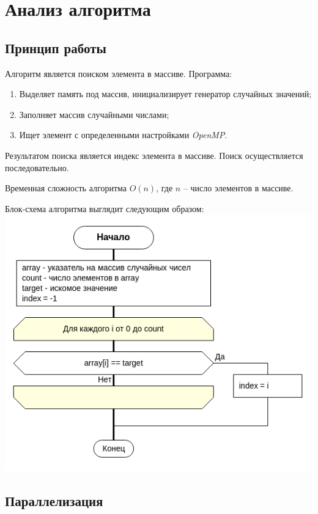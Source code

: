 \section{Анализ алгоритма}

\subsection{Принцип работы}

Алгоритм является поиском элемента в массиве.
Программа:
\begin{enumerate}
    \item Выделяет память под массив, инициализирует генератор случайных значений;
    \item Заполняет массив случайными числами;
    \item Ищет элемент с определенными настройками \textit{OpenMP}.
\end{enumerate}

Результатом поиска является индекс элемента в массиве.
Поиск осуществляется последовательно.

Временная сложность алгоритма $O(n)$, где $n$ -- число элементов в массиве.


Блок-схема алгоритма выглядит следующим образом:\\
\includegraphics[scale=0.6]{res/flowchart.png}

\subsection{Параллелизация}

